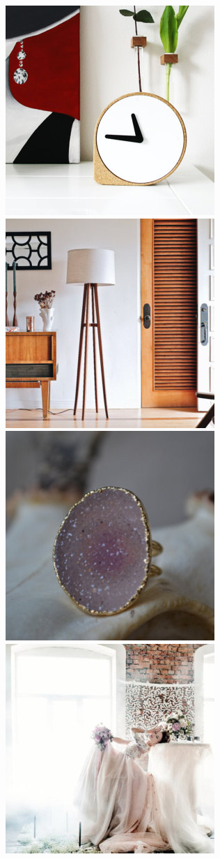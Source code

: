 \documentclass[conference,a4paper]{IEEEtran}
\begin{document}
\begin{figure}
  \centering
    \includegraphics[scale=0.15]{./figures/sample1.jpg}
    \includegraphics[scale=0.15]{./figures/sample2.jpg}
     \includegraphics[scale=0.15]{./figures/sample3.jpg}
    \includegraphics[scale=0.15]{./figures/sample4.jpg}

\end{figure}
\end{document}
